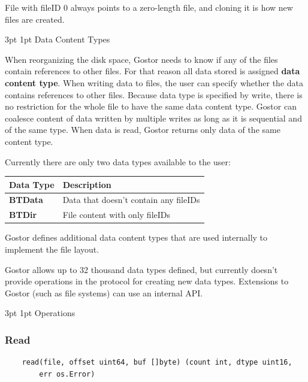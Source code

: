 \documentclass[11pt]{p9article}
\makeatletter
\renewcommand\subsection{\@startsection {subsection}{1}{\z@} {3pt} {1pt} {\normalfont\normalsize\bfseries}}
\makeatother
\begin{document}
File with fileID 0 always points to a zero-length file, and cloning it
is how new files are created.

\subsection{Data Content Types}

When reorganizing the disk space, Gostor needs to know if any of the
files contain references to other files. For that reason all data
stored is assigned {\bfseries data content type}. When writing data to
files, the user can specify whether the data contains references to
other files. Because data type is specified by write, there is no
restriction for the whole file to have the same data content type.
Gostor can coalesce content of data written by multiple writes as long
as it is sequential and of the same type. When data is read, Gostor
returns only data of the same content type.

Currently there are only two data types available to the user:

\begin{tabular}{lp{9cm}}
Data Type & Description \\
\hline
{\bfseries BTData} & Data that doesn't contain any fileIDs \\
{\bfseries BTDir} & File content with only fileIDs \\
\end{tabular}

Gostor defines additional data content types that are used internally
to implement the file layout.

Gostor allows up to 32 thousand data types defined, but currently
doesn't provide operations in the protocol for creating new data
types. Extensions to Gostor (such as file systems) can use an internal
API.

\subsection{Operations}

\subsubsection{Read}

\begin{verbatim}
    read(file, offset uint64, buf []byte) (count int, dtype uint16,
        err os.Error)
\end{verbatim}
\end{document}
